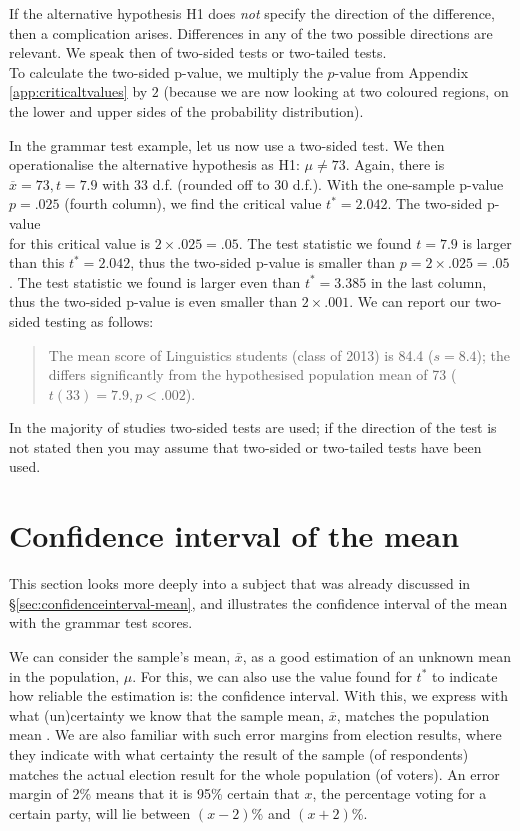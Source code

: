 \documentclass[
]{book}
\begin{document}
If the alternative hypothesis H1 does \emph{not} specify the direction of the
difference, then a complication arises. Differences in any of the two possible directions
are relevant. We speak then of two-sided tests or two-tailed tests.\\
To calculate the two-sided p-value, we multiply the \(p\)-value from
Appendix \ref{app:criticaltvalues} by \(2\) (because we are now looking at two
coloured regions, on the lower and upper sides of the probability distribution).

In the grammar test example, let us now use a two-sided test. We
then operationalise the alternative hypothesis as H1: \(\mu \ne 73\).
Again, there is \(\overline{x}=73, t=7.9\) with 33 d.f. (rounded off to 30 d.f.).
With the one-sample p-value \(p=.025\) (fourth column), we find
the critical value \(t^*=2.042\). The two-sided p-value\\
for this critical value is \(2 \times .025 = .05\). The test statistic we found
\(t=7.9\) is larger than this \(t^*=2.042\), thus the two-sided
p-value is smaller than \(p=2\times.025=.05\). The test statistic we found
is larger even than \(t^*=3.385\) in the last column,
thus the two-sided p-value is even smaller than
\(2\times.001\). We can report our two-sided testing as
follows:

\begin{quote}
The mean score of Linguistics students (class of 2013) is
84.4 (\(s=8.4\)); the differs significantly from the hypothesised
population mean of 73 (\(t(33)=7.9, p<.002\)).
\end{quote}

In the majority of studies two-sided tests are used; if the direction
of the test is not stated then you may assume that two-sided or two-tailed tests
have been used.

\hypertarget{sec:t-confidenceinterval-mean}{%
\section{Confidence interval of the mean}\label{sec:t-confidenceinterval-mean}}

This section looks more deeply into a subject that was already discussed in
§\ref{sec:confidenceinterval-mean}, and illustrates the confidence interval
of the mean with the grammar test scores.

We can consider the sample's mean, \(\overline{x}\), as a good estimation
of an unknown mean in the population,
\(\mu\). For this, we can also use the value found for \(t^*\) to indicate how
reliable the estimation is: the confidence interval. With this, we express
with what (un)certainty we know that the sample mean, \(\overline{x}\), matches
the population mean \citep{Cumm12}. We are also familiar with such error margins
from election results, where they indicate with what certainty the result
of the sample (of respondents) matches the actual election result for the whole
population (of voters). An
error margin of 2\% means that it is 95\% certain that \(x\), the percentage voting
for a certain party, will lie between \((x-2)\)\% and \((x+2)\)\%.
\end{document}
